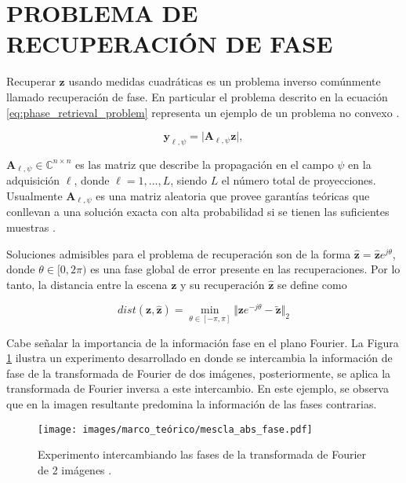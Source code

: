 \section{PROBLEMA DE RECUPERACIÓN DE FASE}

Recuperar $\mathbf{z}$ usando medidas cuadráticas es un problema inverso comúnmente llamado recuperación de fase. En particular el problema descrito en la ecuación \eqref{eq:phase_retrieval_problem} representa un ejemplo de un problema no convexo . 

\begin{equation}
    \mathbf{y}_{\ell, \psi} = \vert \mathbf{A}_{\ell, \psi}\mathbf{z} \vert, 
    \label{eq:phase_retrieval_problem}
\end{equation}

$\mathbf{A}_{\ell, \psi}\in\mathbb{C}^{n\times n}$ es las matriz que describe la propagación en el campo $\psi$ en la adquisición $\ell$, donde $\ell=1,\dots,L$, siendo $L$ el número total de proyecciones. Usualmente $\mathbf{A}_{\ell, \psi}$ es una matriz aleatoria que provee garantías teóricas que conllevan a una solución exacta con alta probabilidad si se tienen las suficientes muestras . 

Soluciones admisibles para el problema de recuperación son de la forma $\hat{\mathbf{z}} = \hat{\mathbf{z}}e^{j\theta}$, donde $\theta \in [0, 2\pi)$ es una fase global de error presente en las recuperaciones. Por lo tanto, la distancia entre la escena $\mathbf{z}$ y su recuperación $\hat{\mathbf{z}}$ se define como

\begin{equation}
    dist(\mathbf{z}, \hat{\mathbf{z}}) = \min_{\theta \in [-\pi, \pi]}\Vert \mathbf{z}e^{-j\theta} - \tilde{\mathbf{z}}\Vert_2
\end{equation}

Cabe señalar la importancia de la información fase en el plano Fourier. La Figura \ref{fig:mescla_fases} ilustra un experimento desarrollado en  donde se intercambia la información de fase de la transformada de Fourier de dos imágenes, posteriormente, se aplica la transformada de Fourier inversa a este intercambio. En este ejemplo, se observa que en la imagen resultante predomina la información de las fases contrarias.

\begin{figure}[!h]
    \centering
    \texttt{[image: images/marco\_teórico/mescla\_abs\_fase.pdf]}
    \caption{\hspace{2mm}Experimento  intercambiando las fases de la transformada de Fourier de 2 imágenes .}
    \label{fig:mescla_fases}
\end{figure}


